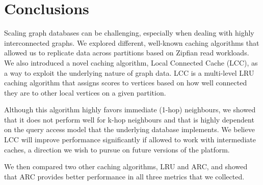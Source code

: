 
\section{Conclusions}

Scaling graph databases can be challenging, especially when dealing with highly
interconnected graphs.  We explored different, well-known caching algorithms
that allowed us to replicate data across partitions based on Zipfian read
workloads.  We also introduced a novel caching algorithm, Local Connected Cache
(LCC), as a way to exploit the underlying nature of graph data. LCC is a
multi-level LRU caching algorithm that assigns scores to vertices based on how
well connected they are to other local vertices on a given partition.

Although this algorithm highly favors immediate (1-hop) neighbours, we
showed that it does not perform well for k-hop neighbours and that is highly
dependent on the query access model that the underlying database implements.
We believe LCC will improve performance significantly if allowed to work with
intermediate caches, a direction we wish to pursue on future versions of the
platform.

We then compared two other caching algorithms, LRU and ARC, and showed
that ARC provides better performance in all three metrics that we collected.
